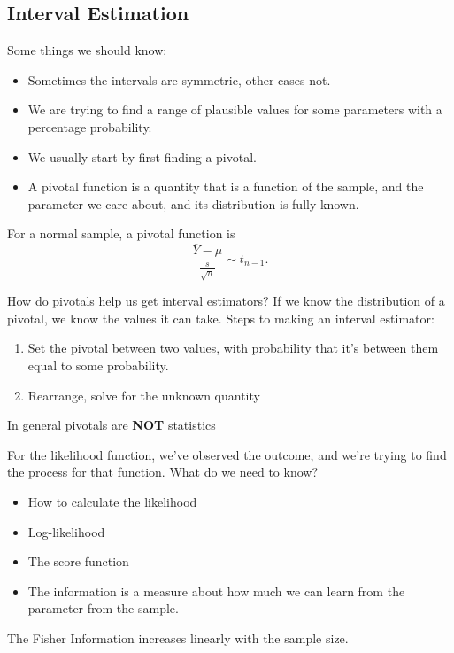 \subsection{Interval Estimation}
Some things we should know:
\begin{itemize}
	\item Sometimes the intervals are symmetric, other cases not.
	\item We are trying to find a range of plausible values for some parameters with a percentage probability.
	\item We usually start by first finding a pivotal.
	\item A pivotal function is a quantity that is a function of the sample, and the parameter we care about, and its distribution is fully known.
\end{itemize}

\begin{eg}
	For a normal sample, a pivotal function is \[
		\frac{\overline{Y}-\mu}{\frac{s}{\sqrt{n} }} \sim t_{n-1}
	.\] 
\end{eg}

How do pivotals help us get interval estimators? If we know the distribution of a pivotal, we know the values it can take. Steps to making an interval estimator:

\begin{enumerate}
	\item Set the pivotal between two values, with probability that it's between them equal to some probability. 
	\item Rearrange, solve for the unknown quantity
\end{enumerate}

In general pivotals are \textbf{NOT} statistics

For the likelihood function, we've observed the outcome, and we're trying to find the process for that function. What do we need to know?

\begin{itemize}
	\item How to calculate the likelihood
	\item Log-likelihood
	\item The score function
	\item The information is a measure about how much we can learn from the parameter from the sample. 
\end{itemize}

\begin{remark}
	The Fisher Information increases linearly with the sample size.
\end{remark}

